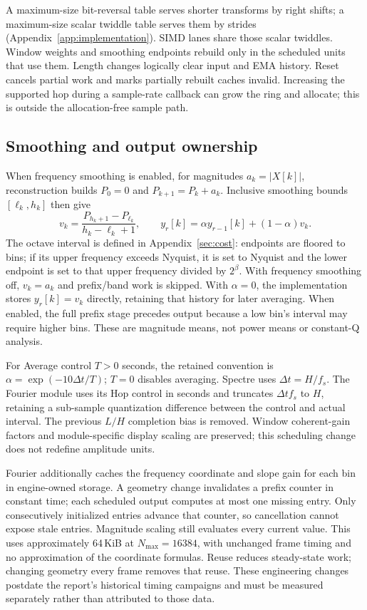 A maximum-size bit-reversal table serves shorter transforms by right shifts;
a maximum-size scalar twiddle table serves them by strides (Appendix~\ref{app:implementation}). SIMD lanes share
those scalar twiddles. Window weights and smoothing endpoints rebuild only in
the scheduled units that use them. Length changes logically clear input and
EMA history. Reset cancels partial work and marks partially rebuilt caches
invalid. Increasing the supported hop during a sample-rate callback can grow
the ring and allocate; this is outside the allocation-free sample path.

\subsection{Smoothing and output ownership}
When frequency smoothing is enabled, for magnitudes $a_k=|X[k]|$,
reconstruction builds $P_0=0$ and
$P_{k+1}=P_k+a_k$. Inclusive smoothing bounds $[\ell_k,h_k]$ then give
\begin{equation}
 v_k=\frac{P_{h_k+1}-P_{\ell_k}}{h_k-\ell_k+1},\qquad
 y_r[k]=\alpha y_{r-1}[k]+(1-\alpha)v_k.
\end{equation}
The octave interval is defined in Appendix~\ref{sec:cost}: endpoints are floored
to bins; if its upper frequency exceeds Nyquist, it is set to Nyquist and the
lower endpoint is set to that upper frequency divided by $2^\beta$. With
frequency smoothing off, $v_k=a_k$ and prefix/band work is skipped. With
$\alpha=0$, the implementation stores $y_r[k]=v_k$ directly, retaining that
history for later averaging. When enabled, the full prefix stage precedes output
because a low bin's interval may require higher bins. These are magnitude
means, not power means or constant-Q analysis.

For Average control $T>0$ seconds, the retained convention is
$\alpha=\exp(-10\Delta t/T)$; $T=0$ disables averaging. Spectre uses $\Delta
t=H/f_s$. The Fourier module uses its Hop control in seconds and truncates
$\Delta t f_s$ to $H$, retaining a sub-sample quantization difference between
the control and actual interval. The previous $L/H$ completion bias is removed.
Window coherent-gain factors and module-specific display scaling are preserved;
this scheduling change does not redefine amplitude units.

Fourier additionally caches the frequency coordinate and slope gain for each
bin in engine-owned storage. A geometry change invalidates a prefix counter
in constant time; each scheduled output computes at most one missing entry.
Only consecutively initialized entries advance that counter, so cancellation
cannot expose stale entries. Magnitude scaling still evaluates every current
value. This uses approximately 64\,KiB at $N_{\max}=16384$, with unchanged
frame timing and no approximation of the coordinate formulas. Reuse reduces
steady-state work; changing geometry every frame removes that reuse. These
engineering changes postdate the report's historical timing campaigns and
must be measured separately rather than attributed to those data.

